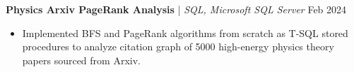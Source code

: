 \textbf{Physics Arxiv PageRank Analysis} | \textit{SQL, Microsoft SQL Server} \hfill Feb 2024 \par
\begin{itemize}
	\item Implemented BFS and PageRank algorithms from scratch as T-SQL stored procedures to analyze citation graph of 5000 high-energy physics theory papers sourced from Arxiv.
\end{itemize}